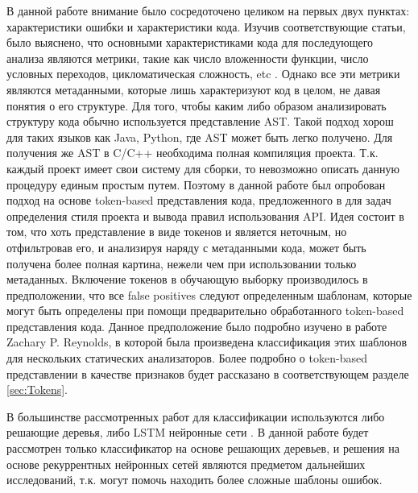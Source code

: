 В данной работе внимание было сосредоточено целиком на первых двух пунктах: характеристики ошибки и характеристики кода. Изучив соответствующие статьи, было выяснено, что основными характеристиками кода для последующего анализа являются метрики, такие как число вложенности функции, число условных переходов, цикломатическая сложность, etc \cite{test-suites-for-dataset}. Однако все эти метрики являются метаданными, которые лишь характеризуют код в целом, не давая понятия о его структуре. Для того, чтобы каким либо образом анализировать структуру кода обычно используется представление AST\cite{Shedko2020ApplyingPM}. Такой подход хорош для таких языков как Java, Python, где AST может быть легко получено. Для получения же AST в C/C++ необходима полная компиляция проекта. Т.к. каждый проект имеет свои систему для сборки, то невозможно описать данную процедуру единым простым путем. Поэтому в данной работе был опробован подход на основе token-based представления кода, предложенного в \cite{Shedko2020ApplyingPM} для задач определения стиля проекта и вывода правил использования API. Идея состоит в том, что хоть представление в виде токенов и является неточным, но отфильтровав его, и анализируя наряду с метаданными кода, может быть получена более полная картина, нежели чем при использовании только метаданных. Включение токенов в обучающую выборку производилось в предположении, что все false positives следуют определенным шаблонам, которые могут быть определены при помощи предварительно обработанного token-based представления кода. Данное предположение было подробно изучено в работе Zachary P. Reynolds\cite{Reynolds}, в которой была произведена классификация этих шаблонов для нескольких статических анализаторов. Более подробно о token-based представлении в качестве признаков будет рассказано в соответствующем разделе \ref{sec:Tokens}.

В большинстве рассмотренных работ для классификации используются либо решающие деревья, либо LSTM нейронные сети\cite{test-suites-for-dataset} \cite{assesing-validity-of-sa-warnings-cisco}. В данной работе будет рассмотрен только классификатор на основе решающих деревьев, и решения на основе рекуррентных нейронных сетей являются предметом дальнейших исследований, т.к. могут помочь находить более сложные шаблоны ошибок.

